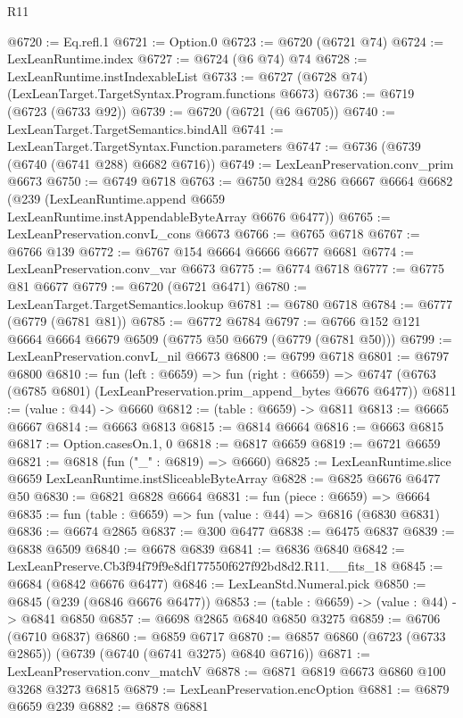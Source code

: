 \begin{lexlean}{R11}
\begin{coremodule}
@6720 := Eq.refl.{1}
@6721 := Option.{0}
@6723 := @6720 (@6721 @74)
@6724 := LexLeanRuntime.index
@6727 := @6724 (@6 @74) @74
@6728 := LexLeanRuntime.instIndexableList
@6733 := @6727 (@6728 @74) (LexLeanTarget.TargetSyntax.Program.functions @6673)
@6736 := @6719 (@6723 (@6733 @92))
@6739 := @6720 (@6721 (@6 @6705))
@6740 := LexLeanTarget.TargetSemantics.bindAll
@6741 := LexLeanTarget.TargetSyntax.Function.parameters
@6747 := @6736 (@6739 (@6740 (@6741 @288) @6682 @6716))
@6749 := LexLeanPreservation.conv_prim @6673
@6750 := @6749 @6718
@6763 := @6750
    @284
    @286
    @6667
    @6664
    @6682
    (@239 (LexLeanRuntime.append @6659 LexLeanRuntime.instAppendableByteArray @6676 @6477))
@6765 := LexLeanPreservation.convL_cons @6673
@6766 := @6765 @6718
@6767 := @6766 @139
@6772 := @6767 @154 @6664 @6666 @6677 @6681
@6774 := LexLeanPreservation.conv_var @6673
@6775 := @6774 @6718
@6777 := @6775 @81 @6677
@6779 := @6720 (@6721 @6471)
@6780 := LexLeanTarget.TargetSemantics.lookup
@6781 := @6780 @6718
@6784 := @6777 (@6779 (@6781 @81))
@6785 := @6772 @6784
@6797 := @6766 @152 @121 @6664 @6664 @6679 @6509 (@6775 @50 @6679 (@6779 (@6781 @50)))
@6799 := LexLeanPreservation.convL_nil @6673
@6800 := @6799 @6718
@6801 := @6797 @6800
@6810 := fun (left : @6659) =>
  fun (right : @6659) =>
  @6747 (@6763 (@6785 @6801) (LexLeanPreservation.prim_append_bytes @6676 @6477))
@6811 := (value : @44) -> @6660
@6812 := (table : @6659) -> @6811
@6813 := @6665 @6667
@6814 := @6663 @6813
@6815 := @6814 @6664
@6816 := @6663 @6815
@6817 := Option.casesOn.{1, 0}
@6818 := @6817 @6659
@6819 := @6721 @6659
@6821 := @6818 (fun ("_" : @6819) => @6660)
@6825 := LexLeanRuntime.slice @6659 LexLeanRuntime.instSliceableByteArray
@6828 := @6825 @6676 @6477 @50
@6830 := @6821 @6828 @6664
@6831 := fun (piece : @6659) => @6664
@6835 := fun (table : @6659) => fun (value : @44) => @6816 (@6830 @6831)
@6836 := @6674 @2865
@6837 := @300 @6477
@6838 := @6475 @6837
@6839 := @6838 @6509
@6840 := @6678 @6839
@6841 := @6836 @6840
@6842 := LexLeanPreserve.Cb3f94f79f9e8df177550f627f92bd8d2.R11.__fits_18
@6845 := @6684 (@6842 @6676 @6477)
@6846 := LexLeanStd.Numeral.pick
@6850 := @6845 (@239 (@6846 @6676 @6477))
@6853 := (table : @6659) -> (value : @44) -> @6841 @6850
@6857 := @6698 @2865 @6840 @6850 @3275
@6859 := @6706 (@6710 @6837)
@6860 := @6859 @6717
@6870 := @6857 @6860 (@6723 (@6733 @2865)) (@6739 (@6740 (@6741 @3275) @6840 @6716))
@6871 := LexLeanPreservation.conv_matchV
@6878 := @6871 @6819 @6673 @6860 @100 @3268 @3273 @6815
@6879 := LexLeanPreservation.encOption
@6881 := @6879 @6659 @239
@6882 := @6878 @6881

\end{coremodule}
\end{lexlean}
